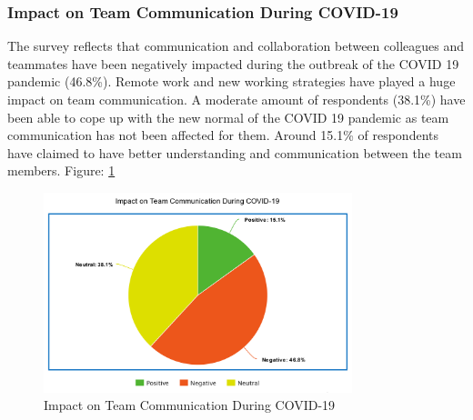 \documentclass[11pt]{article}
\begin{document}
\subsubsection{ Impact on Team Communication During COVID-19}
The survey reflects that communication and collaboration between colleagues and teammates have been negatively impacted during the outbreak of the COVID 19 pandemic (46.8\%). Remote work and new working strategies have played a huge impact on team communication. A moderate amount of respondents (38.1\%) have been able to cope up with the new normal of the COVID 19 pandemic as team communication has not been affected for them. Around 15.1\% of respondents have claimed to have better understanding and communication between the team members. Figure: \ref{Team Communication}
\newpage
\begin{figure}[!ht]
	\centering
	\includegraphics[width=0.8\textwidth]{Images/Collaboration/Team Communication.png}
	\caption{Impact on Team Communication During COVID-19}
	\centering
	\label{Team Communication}
\end{figure}
\end{document}
